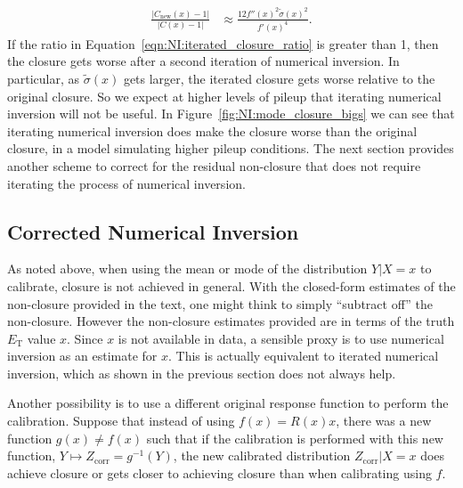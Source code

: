 \begin{align}
\frac{|C_\text{new}(x)-1|}{|C(x)-1|} &\approx \frac{12f''(x)^2\tilde{\sigma}(x)^2}{f'(x)^4}\label{eqn:NI:iterated_closure_ratio}.
\end{align}
If the ratio in Equation~\ref{eqn:NI:iterated_closure_ratio} is greater than 1, then the closure gets worse after a second iteration of numerical inversion.  In particular, as $\tilde{\sigma}(x)$ gets larger, the iterated closure gets worse relative to the original closure. So we expect at higher levels of pileup that iterating numerical inversion will not be useful. In Figure~\ref{fig:NI:mode_closure_bigs} we can see that iterating numerical inversion does make the closure worse than the original closure, in a model simulating higher pileup conditions.  The next section provides another scheme to correct for the residual non-closure that does not require iterating the process of numerical inversion.

\subsection{Corrected Numerical Inversion}
\label{sec:NI:corrected_numerical_inversion_text}
As noted above, when using the mean or mode of the distribution $Y|X=x$ to calibrate, closure is not achieved in general. With the closed-form estimates of the non-closure provided in the text, one might think to simply ``subtract off'' the non-closure. However the non-closure estimates provided are in terms of the truth $E_\text{T}$ value $x$.  Since $x$ is not available in data, a sensible proxy is to use numerical inversion as an estimate for $x$.  This is actually equivalent to iterated numerical inversion, which as shown in the previous section does not always help.

Another possibility is to use a different original response function to perform the calibration.  Suppose that instead of using $f(x)=R(x)x$, there was a new function $g(x)\ne f(x)$ such that if the calibration is performed with this new function, $Y\mapsto Z_\text{corr}=g^{-1}(Y)$, the new calibrated distribution $Z_\text{corr}|X=x$ does achieve closure or gets closer to achieving closure than when calibrating using $f$.

